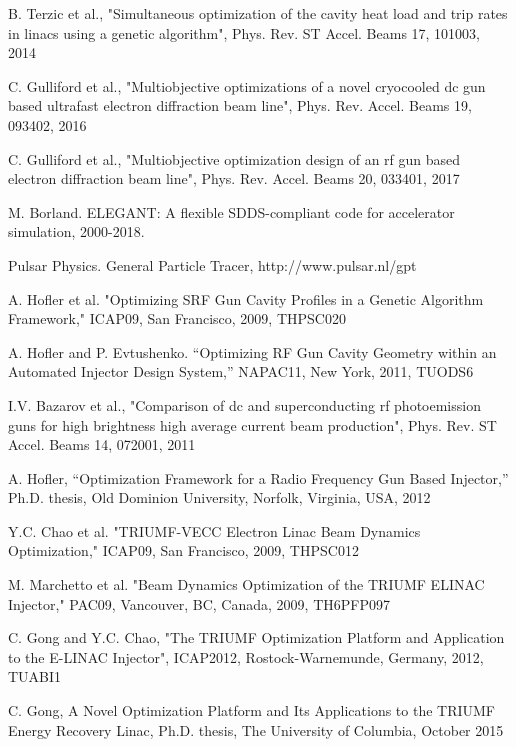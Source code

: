 \documentclass{article}
\begin{document}
{\color{blue}{Included in updated bibliography (in addition to two references above):}}

B. Terzic et al., "Simultaneous optimization of the cavity heat load
and trip rates in linacs using a genetic algorithm", Phys. Rev. ST
Accel. Beams 17, 101003, 2014

C. Gulliford et al., "Multiobjective optimizations of a novel
cryocooled dc gun based ultrafast electron diffraction beam line",
Phys. Rev. Accel. Beams 19, 093402, 2016

C. Gulliford et al., "Multiobjective optimization design of an rf gun
based electron diffraction beam line", Phys. Rev. Accel. Beams 20,
033401, 2017

M. Borland. ELEGANT: A flexible SDDS-compliant code for accelerator simulation, 2000-2018.
{\color{blue}{(slightly updated this reference)}}

Pulsar Physics. General Particle Tracer, http://www.pulsar.nl/gpt

{\color{blue}{Exluded from updated bibliography, because  they are in A. Hofler 13':}}

A. Hofler et al. "Optimizing SRF Gun Cavity Profiles in a Genetic
Algorithm Framework," ICAP09, San Francisco, 2009, THPSC020 


A. Hofler and P. Evtushenko. “Optimizing RF Gun Cavity Geometry within
an Automated Injector Design System,” NAPAC11, New York, 2011, TUODS6

I.V. Bazarov et al., "Comparison of dc and superconducting rf
photoemission guns for high brightness high average current beam
production", Phys. Rev. ST Accel. Beams 14, 072001, 2011

A. Hofler, “Optimization Framework for a Radio Frequency Gun Based
Injector,” Ph.D. thesis, Old Dominion University, Norfolk, Virginia,
USA, 2012

{\color{blue}{Excluded because of similarity to other references or scope of paper:}}

Y.C. Chao et al. "TRIUMF-VECC Electron Linac Beam Dynamics
Optimization," ICAP09, San Francisco, 2009, THPSC012

M. Marchetto et al. "Beam Dynamics Optimization of the TRIUMF ELINAC
Injector," PAC09, Vancouver, BC, Canada, 2009, TH6PFP097

C. Gong and Y.C. Chao, "The TRIUMF Optimization Platform and
Application to the E-LINAC Injector", ICAP2012, Rostock-Warnemunde,
Germany, 2012, TUABI1

C. Gong, A Novel Optimization Platform and Its Applications to the
TRIUMF Energy Recovery Linac, Ph.D. thesis, The University of
Columbia, October 2015
\end{document}
